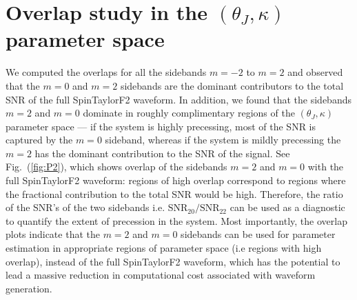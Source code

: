 \section{Overlap study in the $(\theta_J, \kappa)$ parameter space}
We computed the overlaps for all the sidebands $m=-2$
to $m=2$ and observed that the $m=0$ and  $m=2$ sidebands are the dominant
contributors to the total SNR of the full SpinTaylorF2 waveform. In addition, we
found  that the sidebands $m=2$ and $m=0$ dominate in roughly complimentary
regions of the  $(\theta_J, \kappa)$ parameter space --- if the system is highly
precessing, most of the SNR is captured by the $m=0$ sideband, whereas if the
system is mildly precessing the $m=2$ has the dominant contribution to the SNR of
the signal. See Fig.~(\ref{fig:P2}), which shows overlap  of the sidebands $m=2$
and $m=0$ with the full SpinTaylorF2 waveform: regions of high overlap
correspond to regions where the fractional contribution  to the total SNR would
be high. Therefore, the ratio of the SNR's of the two sidebands i.e.
$\text{SNR}_{20}/\text{SNR}_{22}$ can be used as a diagnostic to quantify the
extent of precession in the system. Most importantly, the overlap plots indicate
that the $m=2$ and $m=0$ sidebands can be used for parameter estimation in
appropriate regions of parameter space (i.e regions with high overlap), instead
of the full SpinTaylorF2 waveform, which has the potential to lead a massive reduction in
computational cost associated with waveform generation. 

